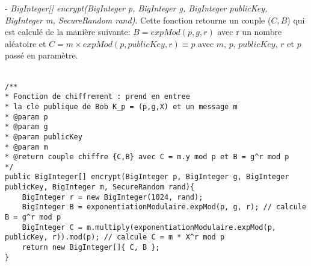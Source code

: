 \documentclass[a4paper,11pt]{article}
\begin{document}
    - \textit{BigInteger[] encrypt(BigInteger p, BigInteger g, BigInteger publicKey, BigInteger m, SecureRandom rand)}. Cette fonction retourne un couple ($C,B$) qui est calculé de la manière suivante: $B = expMod(p,g,r)$ avec r un nombre aléatoire et $C = m \times expMod(p, publicKey,r) \equiv p$ avec $m$, $p$, $publicKey$, $r$ et $p$ passé en paramètre.\\\\\begin{lstlisting}[caption=encrypt, captionpos=b,breaklines = true]
/**
* Fonction de chiffrement : prend en entree
* la cle publique de Bob K_p = (p,g,X) et un message m
* @param p
* @param g
* @param publicKey
* @param m
* @return couple chiffre {C,B} avec C = m.y mod p et B = g^r mod p
*/
public BigInteger[] encrypt(BigInteger p, BigInteger g, BigInteger publicKey, BigInteger m, SecureRandom rand){
    BigInteger r = new BigInteger(1024, rand);
    BigInteger B = exponentiationModulaire.expMod(p, g, r); // calcule B = g^r mod p
    BigInteger C = m.multiply(exponentiationModulaire.expMod(p, publicKey, r)).mod(p); // calcule C = m * X^r mod p
    return new BigInteger[]{ C, B };
}
    \end{lstlisting}
\end{document}
